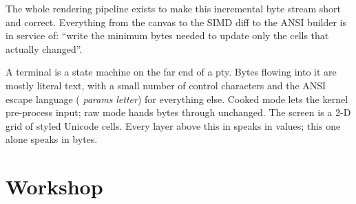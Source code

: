 \begin{idea}
The whole \maya{} rendering pipeline exists to make this incremental
byte stream short and correct. Everything from the canvas to the
SIMD diff to the ANSI builder is in service of: ``write the minimum
bytes needed to update only the cells that actually changed''.
\end{idea}

\begin{recap}
A terminal is a state machine on the far end of a pty. Bytes flowing
into it are mostly literal text, with a small number of control
characters and the ANSI escape language (\code{ESC [} \emph{params}
\emph{letter}) for everything else. Cooked mode lets the kernel
pre-process input; raw mode hands bytes through unchanged. The screen
is a 2-D grid of styled Unicode cells. Every layer above this in
\maya{} speaks in \cpp{} values; this one alone speaks in bytes.
\end{recap}

\section*{Workshop}

